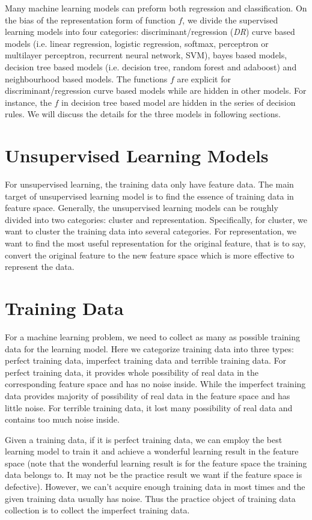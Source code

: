 \documentclass[runningheads,openany]{xhlPaper}
\begin{document}
Many machine learning models can preform both regression and classification. On the bias of the representation form of function $f$, we divide the supervised learning models into four categories: discriminant/regression (\emph{DR}) curve based models (i.e. linear regression, logistic regression, softmax, perceptron or multilayer perceptron, recurrent neural network, SVM), bayes based models, decision tree based models (i.e. decision tree, random forest and adaboost) and neighbourhood based models. The functions $f$ are explicit for discriminant/regression curve based models while are hidden in other models. For instance, the $f$ in decision tree based model are hidden in the series of decision rules. We will discuss the details for the three models in following sections. 

\section{Unsupervised Learning Models}
For unsupervised learning, the training data only have feature data. 
The main target of unsupervised learning model is to find the essence of training data in feature space. 
Generally, the unsupervised learning models can be roughly divided into two categories: cluster and representation. 
Specifically, for cluster, we want to cluster the training data into several categories. For representation, we want to find the most useful representation for the original feature, that is to say, convert the original feature to the new feature space which is more effective to represent the data.

\section{Training Data}
\label{sec:training_data}
For a machine learning problem, we need to collect as many as possible training data for the learning model.
Here we categorize training data into three types: perfect training data, imperfect training data and terrible training data.
For perfect training data, it provides whole possibility of real data in the corresponding feature space and has no noise inside.
While the imperfect training data provides majority of possibility of real data in the feature space and has little noise.
For terrible training data, it lost many possibility of real data and contains too much noise inside.

Given a training data, if it is perfect training data, we can employ the best learning model to train it and achieve a wonderful learning result in the feature space (note that the wonderful learning result is for the feature space the training data belongs to. It may not be the practice result we want if the feature space is defective).
However, we can't acquire enough training data in most times and the given training data usually has noise. 
Thus the practice object of training data collection is to collect the imperfect training data.
\end{document}
